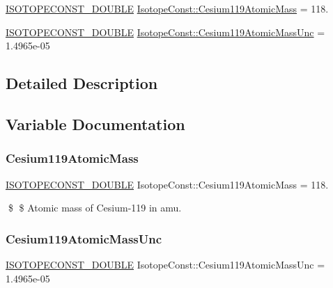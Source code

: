 \begin{DoxyCompactItemize}
\item 
\mbox{\hyperlink{group___isotope_const-_macros_ga8f45a7272ce02c0b4c65c44636ed719a}{I\+S\+O\+T\+O\+P\+E\+C\+O\+N\+S\+T\+\_\+\+D\+O\+U\+B\+LE}} \mbox{\hyperlink{group___isotope_const-_cesium-_cs119_ga806f6dce67c1f89db0b400e234990d35}{Isotope\+Const\+::\+Cesium119\+Atomic\+Mass}} = 118.
\item 
\mbox{\hyperlink{group___isotope_const-_macros_ga8f45a7272ce02c0b4c65c44636ed719a}{I\+S\+O\+T\+O\+P\+E\+C\+O\+N\+S\+T\+\_\+\+D\+O\+U\+B\+LE}} \mbox{\hyperlink{group___isotope_const-_cesium-_cs119_ga642cd810679502ce905c0055867ca917}{Isotope\+Const\+::\+Cesium119\+Atomic\+Mass\+Unc}} = 1.\+4965e-\/05
\end{DoxyCompactItemize}


\subsection{Detailed Description}


\subsection{Variable Documentation}
\mbox{\label{group___isotope_const-_cesium-_cs119_ga806f6dce67c1f89db0b400e234990d35}} 
\subsubsection{\texorpdfstring{Cesium119\+Atomic\+Mass}{Cesium119AtomicMass}}
{\footnotesize\ttfamily \mbox{\hyperlink{group___isotope_const-_macros_ga8f45a7272ce02c0b4c65c44636ed719a}{I\+S\+O\+T\+O\+P\+E\+C\+O\+N\+S\+T\+\_\+\+D\+O\+U\+B\+LE}} Isotope\+Const\+::\+Cesium119\+Atomic\+Mass = 118.}

\$ \$ Atomic mass of Cesium-\/119 in amu. \mbox{\label{group___isotope_const-_cesium-_cs119_ga642cd810679502ce905c0055867ca917}} 
\subsubsection{\texorpdfstring{Cesium119\+Atomic\+Mass\+Unc}{Cesium119AtomicMassUnc}}
{\footnotesize\ttfamily \mbox{\hyperlink{group___isotope_const-_macros_ga8f45a7272ce02c0b4c65c44636ed719a}{I\+S\+O\+T\+O\+P\+E\+C\+O\+N\+S\+T\+\_\+\+D\+O\+U\+B\+LE}} Isotope\+Const\+::\+Cesium119\+Atomic\+Mass\+Unc = 1.\+4965e-\/05}

